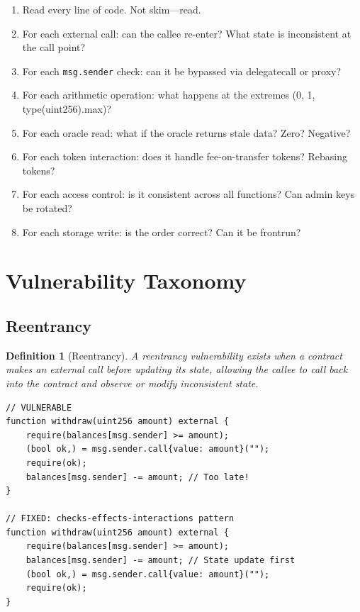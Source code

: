 \documentclass[11pt,a4paper]{article}
\newtheorem{definition}{Definition}
\begin{document}
\begin{enumerate}[nosep]
  \item Read every line of code. Not skim---read.
  \item For each external call: can the callee re-enter? What state is inconsistent at the call point?
  \item For each \texttt{msg.sender} check: can it be bypassed via delegatecall or proxy?
  \item For each arithmetic operation: what happens at the extremes (0, 1, type(uint256).max)?
  \item For each oracle read: what if the oracle returns stale data? Zero? Negative?
  \item For each token interaction: does it handle fee-on-transfer tokens? Rebasing tokens?
  \item For each access control: is it consistent across all functions? Can admin keys be rotated?
  \item For each storage write: is the order correct? Can it be frontrun?
\end{enumerate}

\section{Vulnerability Taxonomy}

\subsection{Reentrancy}

\begin{definition}[Reentrancy]
A reentrancy vulnerability exists when a contract makes an external call before updating
its state, allowing the callee to call back into the contract and observe or modify
inconsistent state.
\end{definition}

\begin{lstlisting}[language=Solidity,caption={Reentrancy vulnerability and fix}]
// VULNERABLE
function withdraw(uint256 amount) external {
    require(balances[msg.sender] >= amount);
    (bool ok,) = msg.sender.call{value: amount}("");
    require(ok);
    balances[msg.sender] -= amount; // Too late!
}

// FIXED: checks-effects-interactions pattern
function withdraw(uint256 amount) external {
    require(balances[msg.sender] >= amount);
    balances[msg.sender] -= amount; // State update first
    (bool ok,) = msg.sender.call{value: amount}("");
    require(ok);
}
\end{lstlisting}
\end{document}
